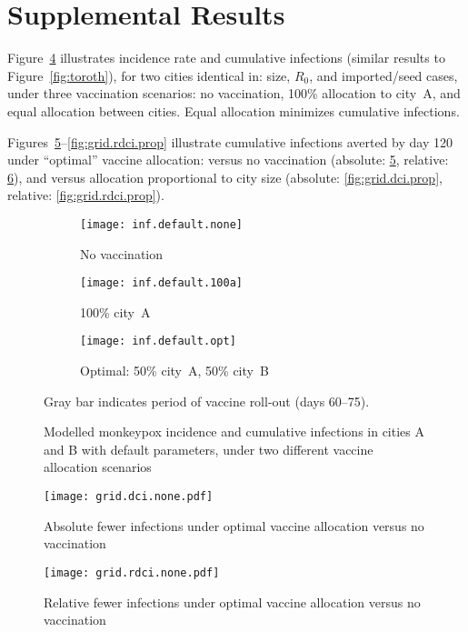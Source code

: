 \section{Supplemental Results}
Figure~\ref{fig:inf.default} illustrates incidence rate and cumulative infections
(similar results to Figure~\ref{fig:toroth}),
for two cities identical in: size, $R_0$, and imported/seed cases,
under three vaccination scenarios:
no vaccination, 100\% allocation to city~A, and equal allocation between cities.
Equal allocation minimizes cumulative infections.
\par
Figures~\ref{fig:grid.dci.none}--\ref{fig:grid.rdci.prop} illustrate
cumulative infections averted by day 120 under ``optimal'' vaccine allocation:
versus no vaccination (absolute: \ref{fig:grid.dci.none}, relative: \ref{fig:grid.rdci.none}), and
versus allocation proportional to city size (absolute: \ref{fig:grid.dci.prop}, relative: \ref{fig:grid.rdci.prop}).
\begin{figure}[h]
  \begin{subfigure}{\linewidth}
    \texttt{[image: inf.default.none]}
    \caption{No vaccination}
    \label{fig:inf.default.none}
  \end{subfigure}
  \begin{subfigure}{\linewidth}
    \texttt{[image: inf.default.100a]}
    \caption{100\% city~A}
    \label{fig:inf.default.100a}
  \end{subfigure}
  \begin{subfigure}{\linewidth}
    \texttt{[image: inf.default.opt]}
    \caption{Optimal: 50\% city~A, 50\% city~B}
    \label{fig:inf.default.opt}
  \end{subfigure}
  \caption{Modelled monkeypox incidence and cumulative infections
    in cities A and B with default parameters,
    under two different vaccine allocation scenarios}
  \label{fig:inf.default}
  \floatfoot
  Gray bar indicates period of vaccine roll-out (days 60--75).
\end{figure}
\begin{figure}[h]
  \texttt{[image: grid.dci.none.pdf]}
  \caption{Absolute fewer infections under optimal vaccine allocation
    versus no vaccination}
  \label{fig:grid.dci.none}
  \floatfoot\gridfoot
\end{figure}
\begin{figure}[h]
  \texttt{[image: grid.rdci.none.pdf]}
  \caption{Relative fewer infections under optimal vaccine allocation
    versus no vaccination}
  \label{fig:grid.rdci.none}
  \floatfoot\gridfoot
\end{figure}
